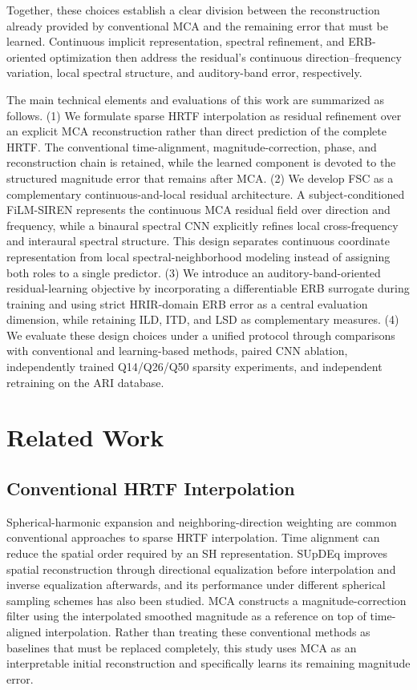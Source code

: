 \documentclass[UTF8,a4paper]{article}
\begin{document}
Together, these choices establish a clear division between the reconstruction already provided by conventional MCA and the remaining error that must be learned. Continuous implicit representation, spectral refinement, and ERB-oriented optimization then address the residual's continuous direction--frequency variation, local spectral structure, and auditory-band error, respectively.

The main technical elements and evaluations of this work are summarized as follows. (1) We formulate sparse HRTF interpolation as residual refinement over an explicit MCA reconstruction rather than direct prediction of the complete HRTF. The conventional time-alignment, magnitude-correction, phase, and reconstruction chain is retained, while the learned component is devoted to the structured magnitude error that remains after MCA. (2) We develop FSC as a complementary continuous-and-local residual architecture. A subject-conditioned FiLM-SIREN represents the continuous MCA residual field over direction and frequency, while a binaural spectral CNN explicitly refines local cross-frequency and interaural spectral structure. This design separates continuous coordinate representation from local spectral-neighborhood modeling instead of assigning both roles to a single predictor. (3) We introduce an auditory-band-oriented residual-learning objective by incorporating a differentiable ERB surrogate during training and using strict HRIR-domain ERB error as a central evaluation dimension, while retaining ILD, ITD, and LSD as complementary measures. (4) We evaluate these design choices under a unified protocol through comparisons with conventional and learning-based methods, paired CNN ablation, independently trained Q14/Q26/Q50 sparsity experiments, and independent retraining on the ARI database.

\section{Related Work}
\label{sec:related}

\subsection{Conventional HRTF Interpolation}

Spherical-harmonic expansion and neighboring-direction weighting are common conventional approaches to sparse HRTF interpolation. Time alignment can reduce the spatial order required by an SH representation\cite{R3}. SUpDEq improves spatial reconstruction through directional equalization before interpolation and inverse equalization afterwards, and its performance under different spherical sampling schemes has also been studied\cite{R2,R2S}. MCA constructs a magnitude-correction filter using the interpolated smoothed magnitude as a reference on top of time-aligned interpolation\cite{R1}. Rather than treating these conventional methods as baselines that must be replaced completely, this study uses MCA as an interpretable initial reconstruction and specifically learns its remaining magnitude error.
\end{document}
